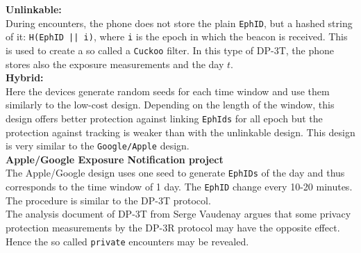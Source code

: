 \documentclass[a4paper, twocolumn]{article}
\begin{document}
\textbf{Unlinkable:}\\
During encounters, the phone does not store the plain \texttt{EphID}, but a hashed string of it: \texttt{H(EphID || i)}, where \texttt{i} is the epoch in which the beacon is received. This is used to create a so called a \texttt{Cuckoo} filter. In this type of DP-3T, the phone stores also the exposure measurements and the day $t$.\\
\textbf{Hybrid:}\\
Here the devices generate random seeds for each time window and use them similarly to the low-cost design. Depending on the length of the window, this design offers better protection against linking \texttt{EphIds} for all epoch but the protection against tracking is weaker than with the unlinkable design. This design is very similar to the \texttt{Google/Apple} design.\\

\noindent \textbf{Apple/Google Exposure Notification project}\\
The Apple/Google design \cite{appGoog} uses one seed to generate \texttt{EphIDs} of the day and thus corresponds to the time window of 1 day. The \texttt{EphID} change every 10-20 minutes. The procedure is similar to the DP-3T protocol.\\

\noindent The analysis document of DP-3T from Serge Vaudenay \cite{analyDP3t} argues that some privacy protection measurements by the DP-3R protocol may have the opposite effect. Hence the so called \texttt{private} encounters may be revealed.
\end{document}
